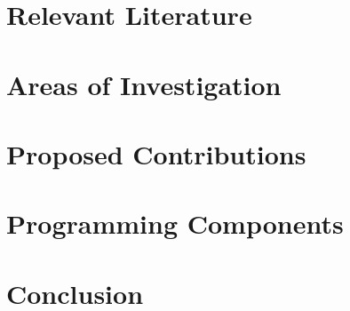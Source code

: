 \documentclass[12pt,conference]{IEEEtran}
\begin{document}
\section{Relevant Literature}

\section{Areas of Investigation}

\section{Proposed Contributions}

\section{Programming Components}

\section{Conclusion}

\begin{thebibliography}{1}
\bibitem{}
\end{thebibliography}
\end{document}

